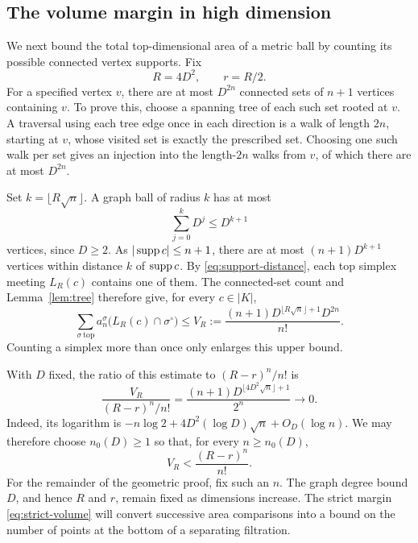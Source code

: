 \subsection{The volume margin in high dimension}

We next bound the total top-dimensional area of a metric ball by
counting its possible connected vertex supports.  Fix
\[
 R=4D^2,\qquad r=R/2.
\]
For a specified vertex \(v\), there are at most \(D^{2n}\)
connected sets of \(n+1\) vertices containing \(v\).  To prove
this, choose a spanning tree of each such set rooted at \(v\).
A traversal using each tree edge once in each direction is a
walk of length \(2n\), starting at \(v\), whose visited set is
exactly the prescribed set.  Choosing one such walk per set
gives an injection into the length-\(2n\) walks from \(v\),
of which there are at most \(D^{2n}\).

Set \(k=\lfloor R\sqrt n\rfloor\).  A graph ball of radius \(k\)
has at most
\[
 \sum_{j=0}^kD^j\leq D^{k+1}
\]
vertices, since \(D\geq2\).  As \(|\operatorname{supp} c|\leq n+1\), there are
at most \((n+1)D^{k+1}\) vertices within distance \(k\) of
\(\operatorname{supp} c\).  By \eqref{eq:support-distance}, each top simplex
meeting \(L_R(c)\) contains one of them.  The connected-set
count and Lemma~\ref{lem:tree} therefore give, for every \(c\in|K|\),
\begin{equation}
 \sum_{\sigma\ \mathrm{top}}
 a_n^\sigma\bigl(L_R(c)\cap\sigma^\circ\bigr)
 \leq V_R:=
 \frac{(n+1)D^{\lfloor R\sqrt n\rfloor+1}D^{2n}}{n!}.
 \label{eq:volume-bound}
\end{equation}
Counting a simplex more than once only enlarges this upper bound.

With \(D\) fixed, the ratio of this estimate to
\((R-r)^n/n!\) is
\[
 \frac{V_R}{(R-r)^n/n!}
 =\frac{(n+1)D^{\lfloor4D^2\sqrt n\rfloor+1}}{2^n}
 \longrightarrow0.
\]
Indeed, its logarithm is
\(-n\log2+4D^2(\log D)\sqrt n+O_D(\log n)\).
We may therefore choose \(n_0(D)\geq1\) so that, for every
\(n\geq n_0(D)\),
\begin{equation}
 V_R<\frac{(R-r)^n}{n!}.
 \label{eq:strict-volume}
\end{equation}
For the remainder of the geometric proof, fix such an \(n\).
The graph degree bound \(D\), and hence \(R\) and \(r\), remain
fixed as dimensions increase.  The strict margin
\eqref{eq:strict-volume} will convert successive area comparisons
into a bound on the number of points at the bottom of a
separating filtration.
